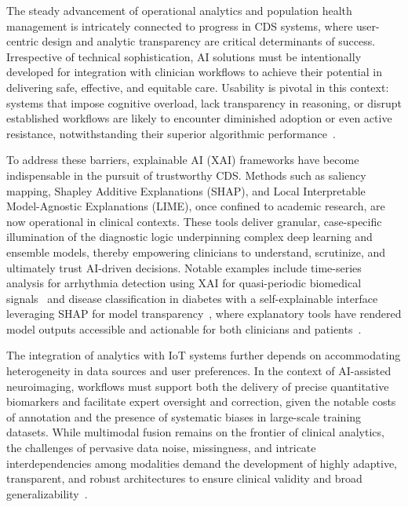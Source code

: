 \documentclass[sigconf]{acmart}
\begin{document}
The steady advancement of operational analytics and population health management is intricately connected to progress in CDS systems, where user-centric design and analytic transparency are critical determinants of success. Irrespective of technical sophistication, AI solutions must be intentionally developed for integration with clinician workflows to achieve their potential in delivering safe, effective, and equitable care. Usability is pivotal in this context: systems that impose cognitive overload, lack transparency in reasoning, or disrupt established workflows are likely to encounter diminished adoption or even active resistance, notwithstanding their superior algorithmic performance~\cite{ref89,ref99}.

To address these barriers, explainable AI (XAI) frameworks have become indispensable in the pursuit of trustworthy CDS. Methods such as saliency mapping, Shapley Additive Explanations (SHAP), and Local Interpretable Model-Agnostic Explanations (LIME), once confined to academic research, are now operational in clinical contexts. These tools deliver granular, case-specific illumination of the diagnostic logic underpinning complex deep learning and ensemble models, thereby empowering clinicians to understand, scrutinize, and ultimately trust AI-driven decisions. Notable examples include time-series analysis for arrhythmia detection using XAI for quasi-periodic biomedical signals~\cite{ref99} and disease classification in diabetes with a self-explainable interface leveraging SHAP for model transparency~\cite{ref87}, where explanatory tools have rendered model outputs accessible and actionable for both clinicians and patients~\cite{ref90}.

The integration of analytics with IoT systems further depends on accommodating heterogeneity in data sources and user preferences. In the context of AI-assisted neuroimaging, workflows must support both the delivery of precise quantitative biomarkers and facilitate expert oversight and correction, given the notable costs of annotation and the presence of systematic biases in large-scale training datasets. While multimodal fusion remains on the frontier of clinical analytics, the challenges of pervasive data noise, missingness, and intricate interdependencies among modalities demand the development of highly adaptive, transparent, and robust architectures to ensure clinical validity and broad generalizability~\cite{ref78,ref90}.
\end{document}
